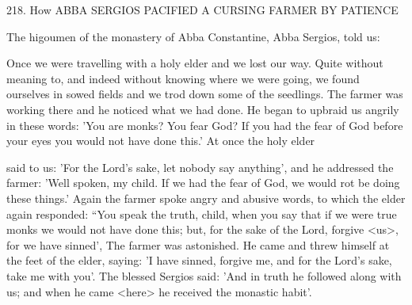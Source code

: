 218.
How ABBA SERGIOS PACIFIED A CURSING
FARMER BY PATIENCE

The higoumen of the monastery of Abba Constantine, Abba
Sergios, told us:

Once we were travelling with a holy elder and we lost our way.
Quite without meaning to, and indeed without knowing where we
were going, we found ourselves in sowed fields and we trod down
some of the seedlings.
The farmer was working there and he noticed
what we had done.
He began to upbraid us angrily in these words:
'You are monks? You fear God? If you had the fear of God before
your eyes you would not have done this.' At once the holy elder

said to us: 'For the Lord's sake, let nobody say anything', and he
addressed the farmer: 'Well spoken, my child.
If we had the fear of
God, we would rot be doing these things.' Again the farmer spoke
angry and abusive words, to which the elder again responded: “You
speak the truth, child, when you say that if we were true monks we
would not have done this; but, for the sake of the Lord, forgive
<us>, for we have sinned', The farmer was astonished.
He came and
threw himself at the feet of the elder, saying: 'I have sinned, forgive
me, and for the Lord's sake, take me with you'.
The blessed Sergios
said: 'And in truth he followed along with us; and when he came
<here> he received the monastic habit'.

